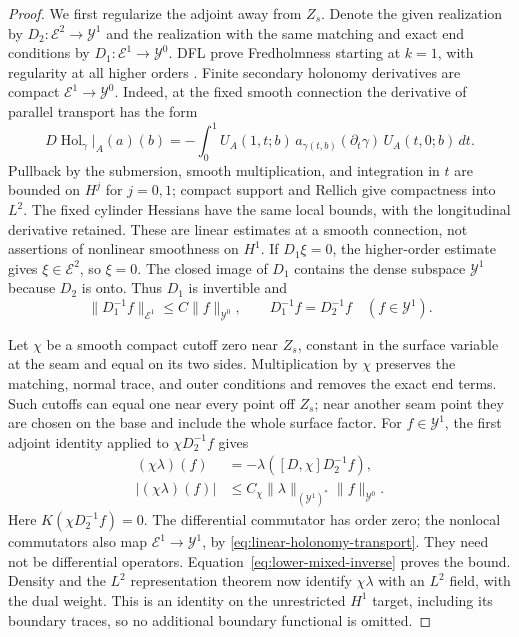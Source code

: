 \documentclass[11pt]{amsart}
\theoremstyle{definition}
\theoremstyle{remark}
\theoremstyle{plain}
\begin{document}
\begin{proof}
We first regularize the adjoint away from $Z_s$. Denote the given
realization by $D_2:\mathcal E^2\to\mathcal Y^1$ and the realization
with the same matching and exact end conditions by
$D_1:\mathcal E^1\to\mathcal Y^0$. DFL prove Fredholmness starting
at $k=1$, with regularity at all higher orders
\cite[Theorem~4.12 and Lemma~4.34]{DaeFukLip21a}.
Finite secondary holonomy derivatives are compact
$\mathcal E^1\to\mathcal Y^0$. Indeed, at the fixed smooth
connection the derivative of parallel transport has the form
\begin{equation}\label{eq:linear-holonomy-transport}
 D\operatorname{Hol}_\gamma|_A(a)(b)=
 -\int_0^1 U_A(1,t;b)\,
   a_{\gamma(t,b)}(\partial_t\gamma)\,U_A(t,0;b)\,dt .
\end{equation}
Pullback by the submersion, smooth multiplication, and integration
in $t$ are bounded on $H^j$ for $j=0,1$; compact support and
Rellich give compactness into $L^2$.
The fixed cylinder Hessians have the same local bounds, with the
longitudinal derivative retained. These are linear estimates at a
smooth connection, not assertions of nonlinear smoothness on $H^1$.
If $D_1\xi=0$, the higher-order estimate gives $\xi\in\mathcal E^2$,
so $\xi=0$. The closed image of $D_1$ contains the dense subspace
$\mathcal Y^1$ because $D_2$ is onto. Thus $D_1$ is invertible and
\begin{equation}\label{eq:lower-mixed-inverse}
 \|D_1^{-1}f\|_{\mathcal E^1}\leq C\|f\|_{\mathcal Y^0},
 \qquad D_1^{-1}f=D_2^{-1}f\quad(f\in\mathcal Y^1).
\end{equation}

Let $\chi$ be a smooth compact cutoff zero near $Z_s$, constant
in the surface variable at the seam and equal on its two sides.
Multiplication by $\chi$ preserves the matching, normal trace,
and outer conditions and removes the exact end terms. Such cutoffs
can equal one near every point off $Z_s$; near another seam point
they are chosen on the base and include the whole surface factor.
For $f\in\mathcal Y^1$, the first adjoint identity applied to
$\chi D_2^{-1}f$ gives
\begin{equation}\label{eq:localized-adjoint-ltwo}
 \begin{aligned}
  (\chi\lambda)(f)&=-\lambda([D,\chi]D_2^{-1}f),\\
  |(\chi\lambda)(f)|&\leq C_\chi
    \|\lambda\|_{(\mathcal Y^1)^*}\|f\|_{\mathcal Y^0}.
 \end{aligned}
\end{equation}
Here $K(\chi D_2^{-1}f)=0$. The differential commutator has
order zero; the nonlocal commutators also map
$\mathcal E^1\to\mathcal Y^1$, by
\eqref{eq:linear-holonomy-transport}. They need not be differential
operators. Equation~\eqref{eq:lower-mixed-inverse} proves the bound.
Density and the $L^2$ representation theorem now identify
$\chi\lambda$ with an $L^2$ field, with the dual weight. This is an
identity on the unrestricted $H^1$ target, including its boundary
traces, so no additional boundary functional is omitted.


\end{proof}
\end{document}
